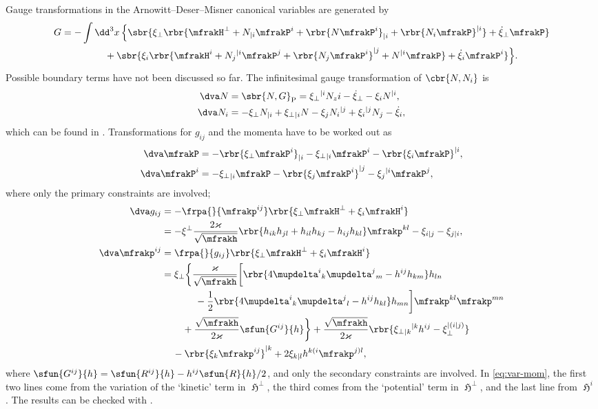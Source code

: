 \documentclass[a4paper,11pt]{article}
\begin{document}
Gauge transformations in the Arnowitt--Deser--Misner canonical variables are 
generated by 
\cite{Castellani1982} 
\begin{align}
G &= -\int\dd^3 x\,\Big\{ \sbr{
	\xi_\perp \rbr{
		\mfrakH^\perp + N_{|i} \mfrakP^i + \rbr{N\mfrakP^i}_{|i} + 
			\rbr{N_i \mfrakP}^{|i}} +
	\dot{\xi}_\perp \mfrakP}
	\nonumber \\ &\qquad\qquad\ \,+ \sbr{
	\xi_i \rbr{
		\mfrakH^i + N_j{}^{|i} \mfrakP^j + \rbr{N_j \mfrakP^i}^{|j} + N^{|i} 
\mfrakP} +
	\dot{\xi}_i \mfrakP^i} \Big\}.
\end{align}
Possible boundary terms have not been discussed so far. The infinitesimal gauge 
transformation of $\cbr{N, N_i}$ is
\begin{align}
\dva N &= \sbr{N, G}_\text{P} = 
\xi_\perp{}^{|i} N_zi - \dot{\xi}_\perp - \xi_i N^{|i}, \\
\dva N_i &= %
- \xi_\perp N_{|i} + \xi_\perp{}_{|i} N
- \xi_j N_{i}{}^{|j} + \xi_i{}^{|j} N_j - \dot{\xi}_i,
\end{align}
which can be found in \cite{Kiriushcheva2008}. Transformations for 
$g_{ij}$ and the momenta have to be worked out as
\begin{align}
\dva \mfrakP &= -\rbr{\xi_\perp \mfrakP^i}_{|i} - \xi_\perp{}_{|i} \mfrakP^i
- \rbr{\xi_i \mfrakP}^{|i},\\
\dva \mfrakP^i &= -\xi_\perp{}_{|i} \mfrakP
- \rbr{\xi_j \mfrakP^i}^{|j} - \xi_j{}^{|i}\mfrakP^j,
\end{align}
where only the primary constraints are involved;
\begin{align}
\dva g_{ij} &= -\frpa{}{\mfrakp^{ij}}
\rbr{\xi_\perp \mfrakH^\perp + \xi_i \mfrakH^i}
\nonumber \\
&= -\xi^\perp \frac{2\varkappa}{\sqrt{\mfrakh}}
\rbr{h_{ik}h_{jl}+h_{il}h_{kj}-h_{ij}h_{kl}} \mfrakp^{kl}
- \xi_{i|j} - \xi_{j|i}, \\
\dva \mfrakp^{ij} &= \frpa{}{g_{ij}}
\rbr{\xi_\perp \mfrakH^\perp + \xi_i \mfrakH^i}
\nonumber \\
&= \xi_\perp \bigg\{\frac{\varkappa}{\sqrt{\mfrakh}}\bigg[
\rbr{4\mupdelta^i{}_k \mupdelta^j{}_m - h^{ij} h_{km}}h_{ln}
\nonumber \\
&\qquad\quad\ \,
-\frac{1}{2}
\rbr{4\mupdelta^i{}_k \mupdelta^j{}_l - h^{ij} h_{kl}}h_{mn}
\bigg] \mfrakp^{kl}\mfrakp^{mn}
\nonumber \\
&\qquad\,
+ \frac{\sqrt{\mfrakh}}{2\varkappa} \sfun{G^{ij}}{h} \bigg\}
+ \frac{\sqrt{\mfrakh}}{2\varkappa} \rbr{
\xi_\perp{}_{|k}{}^{|k} h^{ij} - \xi_\perp^{|(i|j)}}
\nonumber \\
&\quad\,
-\rbr{\xi_k{} \mfrakp^{ij}}^{|k} + 2\xi_{k|l}h^{k(i} \mfrakp^{j)l},
\label{eq:var-mom}
\end{align}
where $\sfun{G^{ij}}{h} = \sfun{R^{ij}}{h} - h^{ij}\sfun{R}{h}/2$, and only the 
secondary constraints are involved. In \cref{eq:var-mom}, the first two lines
come from the variation of the `kinetic' term in $\mfrakH^\perp$, the third
comes from the `potential' term in $\mfrakH^\perp$, and the last line from
$\mfrakH^i$. The results can be checked with \cite[4.2.7]{Poisson2004}.
\end{document}
